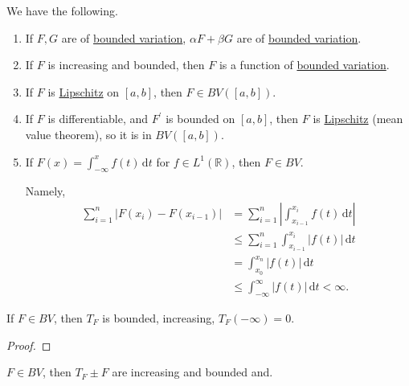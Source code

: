 \begin{remark}
	We have the following.
	\begin{enumerate}
		\item If \(F,G\) are of \hyperref[def:bounded-variation]{bounded variation}, \(\alpha F + \beta G\) are of \hyperref[def:bounded-variation]{bounded variation}.
		\item If \(F\) is increasing and bounded, then \(F\) is a function of \hyperref[def:bounded-variation]{bounded variation}.
		\item If \(F\) is \hyperref[def:Lipschitz]{Lipschitz} on \([a,b]\), then \(F \in BV([a,b])\).
		\item If \(F\) is differentiable, and $F^\prime$ is bounded on \([a,b]\), then \(F\) is \hyperref[def:Lipschitz]{Lipschitz} (mean value theorem), so it is in \(BV([a,b])\).
		\item If \(F(x) = \int_{-\infty}^x f(t) \,\mathrm{d} t\) for \(f \in L^1(\mathbb{R})\), then \(F \in BV\).

		      Namely,
		      \[
			      \begin{split}
				      \sum_{i=1}^n \left\vert F(x_i) - F(x_{i-1}) \right\vert &= \sum_{i=1}^n \left\vert \int_{x_{i-1}}^{x_i} f(t) \,\mathrm{d} t \right\vert \\
				      &\leq \sum_{i=1}^n \int_{x_{i-1}}^{x_i} \left\vert f(t) \right\vert \,\mathrm{d} t \\
				      &= \int_{x_0}^{x_n} \left\vert f(t) \right\vert \,\mathrm{d} t \\
				      &\leq \int_{-\infty}^\infty \left\vert f(t) \right\vert \,\mathrm{d} t < \infty.
			      \end{split}
		      \]
	\end{enumerate}
\end{remark}

\begin{lemma}\label{lma:lec34-1}
	If \(F \in BV\), then \(T_F\) is bounded, increasing, \(T_F(-\infty) = 0\).
\end{lemma}
\begin{proof}
\end{proof}

\begin{lemma}\label{lma:lec34-2}
	\(F \in BV\), then \(T_F \pm F\) are increasing and bounded and.
\end{lemma}

